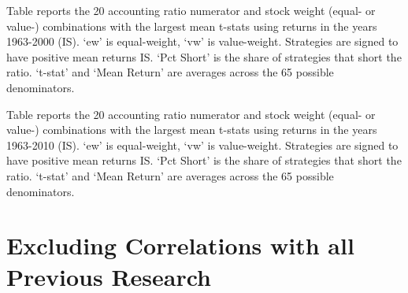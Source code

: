 \begin{table}
\caption{Themes from Mining Accounting Ratios in 2000}\label{tab:dm-theme2000}
\small

Table reports the 20 accounting ratio numerator and stock weight (equal- or value-) combinations with the largest mean t-stats using returns in the years 1963-2000 (IS).  `ew' is equal-weight, `vw' is value-weight. Strategies are signed to have positive mean returns IS. `Pct Short' is the share of strategies that short the ratio.  `t-stat' and  `Mean Return' are averages across the 65 possible denominators. 
\vspace{2ex}

\centering

\setlength{\tabcolsep}{1.0ex}


\end{table}


\begin{table}
\caption{Themes from Mining Accounting Ratios in 2010}\label{tab:dm-theme2010}
\small

Table reports the 20 accounting ratio numerator and stock weight (equal- or value-) combinations with the largest mean t-stats using returns in the years 1963-2010 (IS).  `ew' is equal-weight, `vw' is value-weight. Strategies are signed to have positive mean returns IS. `Pct Short' is the share of strategies that short the ratio.  `t-stat' and  `Mean Return' are averages across the 65 possible denominators. 
\vspace{2ex}

\centering

\setlength{\tabcolsep}{1.0ex}


\end{table}

\clearpage

\section{Excluding Correlations with all Previous Research}\label{sec:robust,research-vs}



